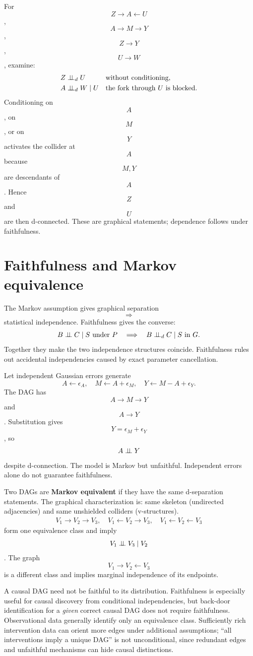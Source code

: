For $$Z\to A\leftarrow U$$, $$A\to M\to Y$$, $$Z\to Y$$, $$U\to W$$, examine:
\begin{align}
Z&\mathrel{\perp\!\!\!\perp}_{d} U &&\text{without conditioning},\\
A&\mathrel{\perp\!\!\!\perp}_{d} W\mid U &&\text{the fork through }U\text{ is blocked}.
\end{align}
Conditioning on $$A$$, on $$M$$, or on $$Y$$ activates the collider at $$A$$ because $$M,Y$$ are descendants of $$A$$. Hence $$Z$$ and $$U$$ are then d-connected. These are graphical statements; dependence follows under faithfulness.

\section{Faithfulness and Markov equivalence}
The Markov assumption gives graphical separation $$\Rightarrow$$ statistical independence. Faithfulness gives the converse:
\begin{equation}
B\mathrel{\perp\!\!\!\perp} C\mid S\text{ under }P\quad\Longrightarrow\quad B\mathrel{\perp\!\!\!\perp}_{d} C\mid S\text{ in }G.
\end{equation}
Together they make the two independence structures coincide. Faithfulness rules out accidental independencies caused by exact parameter cancellation.
\begin{supplement}
Let independent Gaussian errors generate
\begin{equation}
A\leftarrow\epsilon_A,\quad M\leftarrow A+\epsilon_M,\quad
Y\leftarrow M-A+\epsilon_Y.
\end{equation}
The DAG has $$A\to M\to Y$$ and $$A\to Y$$. Substitution gives $$Y=\epsilon_M+\epsilon_Y$$, so $$A\mathrel{\perp\!\!\!\perp} Y$$ despite d-connection. The model is Markov but unfaithful. Independent errors alone do not guarantee faithfulness.
\end{supplement}
Two DAGs are \textbf{Markov equivalent} if they have the same d-separation statements. The graphical characterization is: same skeleton (undirected adjacencies) and same unshielded colliders (v-structures).
\begin{align}
V_1\to V_2\to V_3,\quad V_1\leftarrow V_2\to V_3,\quad
V_1\leftarrow V_2\leftarrow V_3
\end{align}
form one equivalence class and imply $$V_1\mathrel{\perp\!\!\!\perp} V_3\mid V_2$$. The graph $$V_1\to V_2\leftarrow V_3$$ is a different class and implies marginal independence of its endpoints.
\begin{correction}
A causal DAG need not be faithful to its distribution. Faithfulness is especially useful for causal discovery from conditional independencies, but back-door identification for a \emph{given} correct causal DAG does not require faithfulness. Observational data generally identify only an equivalence class. Sufficiently rich intervention data can orient more edges under additional assumptions; ``all interventions imply a unique DAG'' is not unconditional, since redundant edges and unfaithful mechanisms can hide causal distinctions.
\end{correction}

